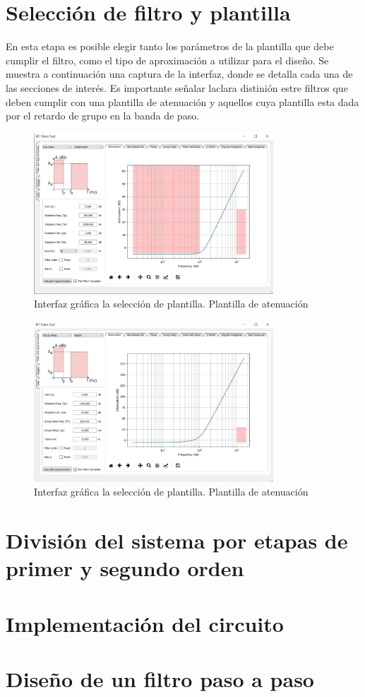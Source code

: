 \section{Selecci\'on de filtro y plantilla}
En esta etapa es posible elegir tanto los par\'ametros de la plantilla que debe cumplir el filtro, como el tipo de aproximaci\'on a utilizar para el dise\~no.
Se muestra a continuaci\'on una captura de la interfaz, donde se detalla cada una de las secciones de inter\'es. Es importante se\~nalar laclara distini\'on estre filtros que deben cumplir con una plantilla de atenuaci\'on y aquellos cuya plantilla esta dada por el retardo de grupo en la banda de paso.
\begin{figure}[H]
    \centering
    \includegraphics[width=0.8\textwidth]{../Resources/ATT_TEMPLATE}
    \caption{Interfaz gr\'afica la selecci\'on de plantilla. Plantilla de atenuaci\'on}
\end{figure} 
\begin{figure}[H]
    \centering
    \includegraphics[width=0.8\textwidth]{../Resources/GD_TEMPLATE}
    \caption{Interfaz gr\'afica la selecci\'on de plantilla. Plantilla de atenuaci\'on}
\end{figure} 

\section{Divisi\'on del sistema por etapas de primer y segundo orden}
\section{Implementaci\'on del circuito}
\section{Dise\~no de un filtro paso a paso}
